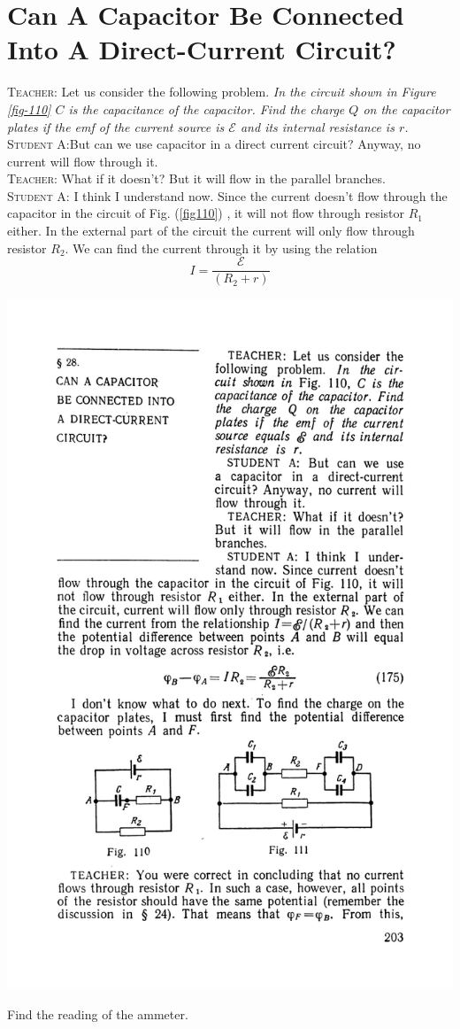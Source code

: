 \documentclass[a4paper,sfsidenotes]{tufte-book}
\newcommand{\Ea}{\mathcal{E}}
\begin{document}
\chapter{Can A Capacitor Be Connected Into A Direct-Current Circuit?}
\label{ch-28}

\textsc{Teacher:} Let us consider the following problem. \emph{In the circuit shown in \emph{Figure \ref{fig-110}} $C$ is the capacitance of the capacitor. Find the charge $Q$ on the capacitor plates if the emf of the current source is $\Ea$ and its internal resistance is $r$.}
\\
\textsc{Student A:}But can we use capacitor in a direct current circuit? Anyway, no current will flow through it.
\\
\textsc{Teacher:} What if it doesn't? But it will flow in the parallel branches.
\\
\textsc{Student A:} I think I understand now. Since the current doesn't flow through the capacitor in the circuit of Fig. (\ref{fig110}) , it will not flow through resistor $R_{1}$ either. In the external part of the circuit the current will only flow through resistor $R_{2}$. We can find the current through it by using the relation 
\begin{equation*}
I = \frac{\Ea}{(R_{2} + r)}
\end{equation*}
\begin{marginfigure}%
\centering
\includegraphics[width=0.8\linewidth]{fig-110a}
\caption{Find the reading of the ammeter.}
\label{fig-110}
\end{marginfigure}
\end{document}
